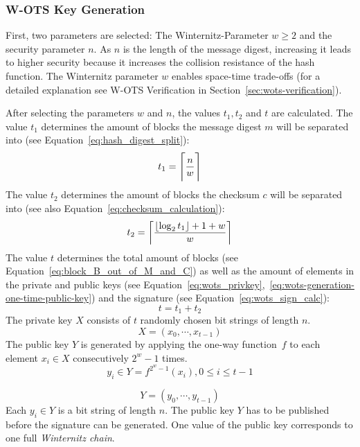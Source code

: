 \subsubsection{W-OTS Key Generation}
\label{sec:WOTS_keygen}
First, two parameters are selected: The Winternitz-Parameter $w \geq 2$ and the security parameter $n$. As $n$ is the length of the message digest, increasing it leads to higher security because it increases the collision resistance of the hash function. The Winternitz parameter $w$ enables space-time trade-offs (for a detailed explanation see W-OTS Verification in Section~\ref{sec:wots-verification}). 

After selecting the parameters $w$ and $n$, the values $t_1, t_2$ and $t$ are calculated.
The value $t_1$ determines the amount of blocks the message digest $m$ will be separated into (see Equation~\ref{eq:hash_digest_split}):
\begin{equation}
\label{eq:t1}
t_1 = \ceil[\Bigg]{\frac{n}{w}}
\end{equation}
The value $t_2$ determines the amount of blocks the checksum $c$ will be separated into (see also Equation~\ref{eq:checksum_calculation}):
\begin{equation}
\label{eq:t2}
t_2 = \ceil*{\frac{\floor*{\log_2 t_1} + 1 + w}{w} }
\end{equation}
The value $t$ determines the total amount of blocks (see Equation~\ref{eq:block_B_out_of_M_and_C}) as well as the amount of elements in the private and public keys (see Equation~\ref{eq:wots_privkey},~\ref{eq:wots-generation-one-time-public-key}) and the signature (see Equation~\ref{eq:wots_sign_calc}):
\begin{equation}
\label{eq:t}
t = t_1 + t_2
\end{equation}
The private key $X$ consists of $t$ randomly chosen bit strings of length $n$.
\begin{equation}
\label{eq:wots_privkey}
X = (x_0, \cdots, x_{t-1})
\end{equation}
The public key $Y$ is generated by applying the one-way function~$f$ to each element $x_i  \in X$  consecutively $2^w - 1$ times.
\begin{equation}
\label{eq:wots-generation-one-time-public-key}
y_i \in Y =  f^{2^w-1}(x_i), 0 \leq i \leq t-1 
\end{equation}

\begin{equation}
\label{eq:wots_pub_one-time-key}
Y = (y_0, \cdots, y_{t-1})
\end{equation}
Each $y_i \in Y$ is a bit string of length $n$. The public key $Y$ has to be published before the signature can be generated. One value of the public key corresponds to one full \textit{Winternitz chain}. 

